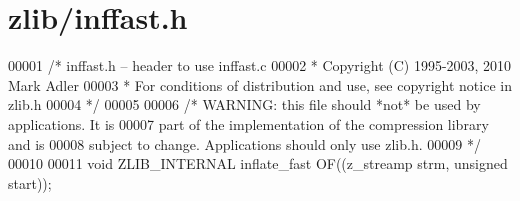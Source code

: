 \hypertarget{zlib_2inffast_8h_source}{}\section{zlib/inffast.h}
\label{zlib_2inffast_8h_source}

\begin{DoxyCode}
00001 \textcolor{comment}{/* inffast.h -- header to use inffast.c}
00002 \textcolor{comment}{ * Copyright (C) 1995-2003, 2010 Mark Adler}
00003 \textcolor{comment}{ * For conditions of distribution and use, see copyright notice in zlib.h}
00004 \textcolor{comment}{ */}
00005 
00006 \textcolor{comment}{/* WARNING: this file should *not* be used by applications. It is}
00007 \textcolor{comment}{   part of the implementation of the compression library and is}
00008 \textcolor{comment}{   subject to change. Applications should only use zlib.h.}
00009 \textcolor{comment}{ */}
00010 
00011 \textcolor{keywordtype}{void} ZLIB\_INTERNAL inflate\_fast OF((z\_streamp strm, \textcolor{keywordtype}{unsigned} start));
\end{DoxyCode}
